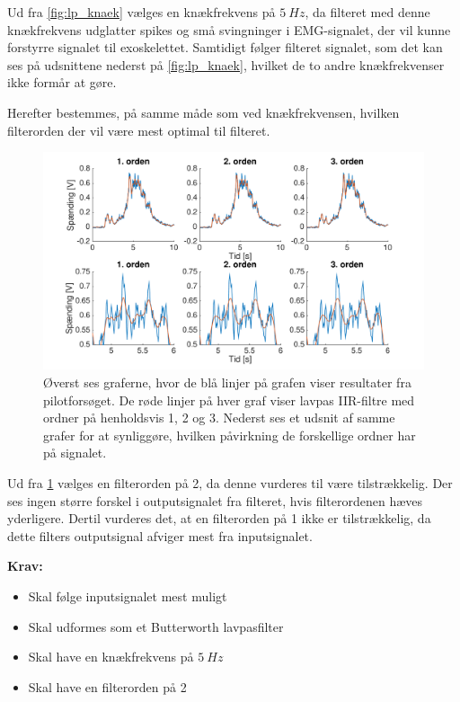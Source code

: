 \noindent
Ud fra \ref{fig:lp_knaek} vælges en knækfrekvens på $5~Hz$, da filteret med denne knækfrekvens udglatter spikes og små svingninger i EMG-signalet, der vil kunne forstyrre signalet til exoskelettet. Samtidigt følger filteret signalet, som det kan ses på udsnittene nederst på \ref{fig:lp_knaek}, hvilket de to andre knækfrekvenser ikke formår at gøre.

Herefter bestemmes, på samme måde som ved knækfrekvensen, hvilken filterorden der vil være mest optimal til filteret. 

\begin{figure} [H]
\centering
\includegraphics[width=1.0\textwidth]{figures/problemloesning/lavpas_orden.pdf}
\caption{Øverst ses graferne, hvor de blå linjer på grafen viser resultater fra pilotforsøget. De røde linjer på hver graf viser lavpas IIR-filtre med ordner på henholdsvis 1, 2 og 3. Nederst ses et udsnit af samme grafer for at synliggøre, hvilken påvirkning de forskellige ordner har på signalet.}
\label{fig:lp_orden}
\end{figure} 

\noindent
Ud fra \ref{fig:lp_orden} vælges en filterorden på 2, da denne vurderes til være tilstrækkelig. Der ses ingen større forskel i outputsignalet fra filteret, hvis filterordenen hæves yderligere. Dertil vurderes det, at en filterorden på 1 ikke er tilstrækkelig, da dette filters outputsignal afviger mest fra inputsignalet. 

\vspace{3mm}

\textbf{Krav:}
\begin{itemize}
\item Skal følge inputsignalet mest muligt  
\item Skal udformes som et Butterworth lavpasfilter
\item Skal have en knækfrekvens på $5~Hz$
\item Skal have en filterorden på 2
\end{itemize}

